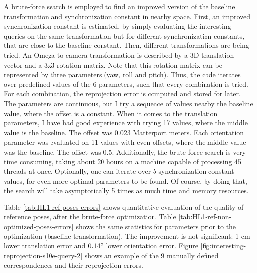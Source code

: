 \documentclass[twoside]{ctuthesis}
\theoremstyle{plain}
\theoremstyle{definition}
\theoremstyle{note}
\begin{document}
A brute-force search is employed to find an improved version of the baseline transformation and synchronization constant in nearby space. First, an improved synchronization constant is estimated, by simply evaluating the interesting queries on the same transformation but for different synchronization constants, that are close to the baseline constant. Then, different transformations are being tried. An Omega to camera transformation is described by a 3D translation vector and a 3x3 rotation matrix. Note that this rotation matrix can be represented by three parameters (yaw, roll and pitch). Thus, the code iterates over predefined values of the 6 parameters, such that every combination is tried. For each combination, the reprojection error is computed and stored for later. The parameters are continuous, but I try a sequence of values nearby the baseline value, where the offset is a constant. When it comes to the translation parameters, I have had good experience with trying 17 values, where the middle value is the baseline. The offset was 0.023 Matterport meters. Each orientation parameter was evaluated on 11 values with even offsets, where the middle value was the baseline. The offset was 0.5\degree. Additionally, the brute-force search is very time consuming, taking about 20 hours on a machine capable of processing 45 threads at once. Optionally, one can iterate over 5 synchronization constant values, for even more optimal parameters to be found. Of course, by doing that, the search will take asymptotically 5 times as much time and memory resources.

Table \ref{tab:HL1-ref-poses-errors} shows quantitative evaluation of the quality of reference poses, after the brute-force optimization. Table \ref{tab:HL1-ref-non-optimized-poses-errors} shows the same statistics for parameters prior to the optimization (baseline transformation). The improvement is not significant: 1 cm lower translation error and $0.14\degree$ lower orientation error. Figure \ref{fig:interesting-reprojection-s10e-query-2} shows an example of the 9 manually defined correspondences and their reprojection errors.
\end{document}
